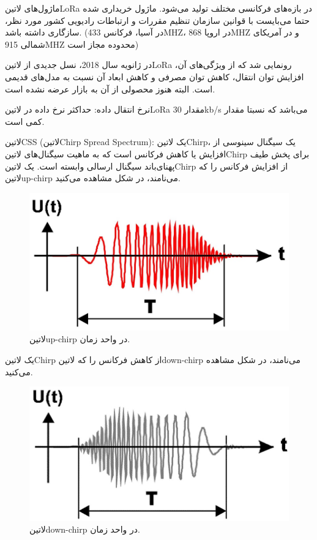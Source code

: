ماژول‌های ‌لاتین{LoRa} در بازه‌های فرکانسی مختلف تولید می‌شود. ماژول خریداری شده حتما می‌بایست با قوانین سازمان تنظیم مقررات و ارتباطات رادیویی کشور مورد نظر، سازگاری داشته باشد. (در آسیا، فرکانس 433MHZ، در اروپا 868MHZ و در آمریکای شمالی 915MHZ محدوده مجاز است)

در ژانویه سال 2018، نسل جدیدی از ‌لاتین{LoRa} رونمایی شد که از ویژگی‌های آن، افزایش توان انتقال، کاهش توان مصرفی و کاهش ابعاد آن نسبت به مدل‌های قدیمی است. البته هنوز محصولی از آن به بازار عرضه نشده است.

نرخ انتقال داده: حداکثر نرخ داده در ‌لاتین{LoRa}  مقدار 30kb/s می‌باشد که نسبتا مقدار کمی است.

‌لاتین{CSS} (‌لاتین{Chirp Spread Spectrum}): یک ‌لاتین{Chirp}، یک سیگنال سینوسی از افزایش یا کاهش فرکانس است که به ماهیت سیگنال‌های ‌لاتین{Chirp} برای پخش طیف پهنای‌باند سیگنال ارسالی وابسته است. یک ‌لاتین{Chirp} از افزایش فرکانس را که ‌لاتین{up-chirp} می‌نامند، در شکل  مشاهده می‌کنید.

\begin{figure}[!h]
	\centering
	\includegraphics[width=0.7\linewidth]{Assets/upchrip.png}
	\caption{‌لاتین{up-chirp} در واحد زمان.}
	\label{fig:upchrip}
\end{figure}

‌‌‌‌‌یک ‌لاتین{Chirp} از کاهش فرکانس را که ‌لاتین{down-chirp} می‌نامند، در شکل  مشاهده می‌کنید.

\begin{figure}[!h]
	\centering
	\includegraphics[width=0.7\linewidth]{Assets/downchrip.png}
	\caption{ ‌لاتین{down-chirp} در واحد زمان.}
	\label{fig:downchrip}
\end{figure}

